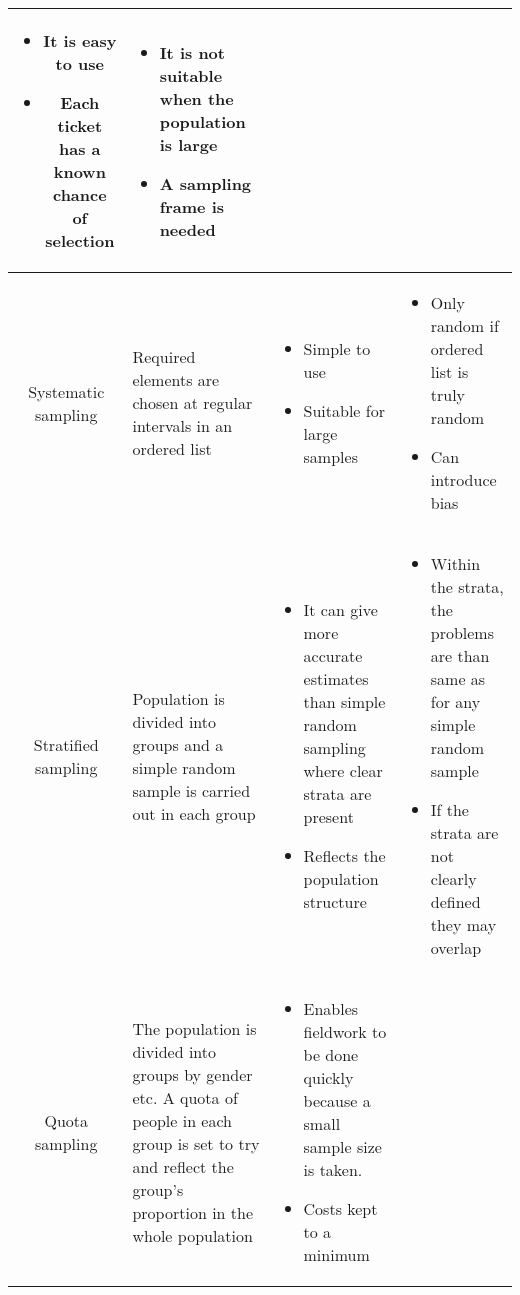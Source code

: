 \documentclass{article}[18pt]
\begin{document}
\begin{tabularx}{\textwidth}{|c|X|X|X|}
\begin{itemize}[noitemsep,topsep=0pt,leftmargin=*]
\item It is easy to use
\item Each ticket has a known chance of selection
\end{itemize}&
\begin{itemize}[noitemsep,topsep=0pt,leftmargin=*]
\item It is not suitable when the population is large
\item A sampling frame is needed
\end{itemize}\\
\hline
Systematic sampling&Required elements are chosen at regular intervals in an ordered list&
\begin{itemize}[noitemsep,topsep=0pt,leftmargin=*]
\item Simple to use
\item Suitable for large samples
\end{itemize}&
\begin{itemize}[noitemsep,topsep=0pt,leftmargin=*]
\item Only random if ordered list is truly random
\item Can introduce bias
\end{itemize}\\
\hline
Stratified sampling&Population is divided into groups and a simple random sample is carried out in each group&
\begin{itemize}[noitemsep,topsep=0pt,leftmargin=*]
\item It can give more accurate estimates than simple random sampling where clear strata are present
\item Reflects the population structure
\end{itemize}&
\begin{itemize}[noitemsep,topsep=0pt,leftmargin=*]
\item Within the strata, the problems are than same as for any simple random sample
\item If the strata are not clearly defined they may overlap
\end{itemize}\\
\hline
Quota sampling&The population is divided into groups by gender etc. A quota of people in each group is set to try and reflect the group's proportion in the whole population&
\begin{itemize}[noitemsep,topsep=0pt,leftmargin=*]
\item Enables fieldwork to be done quickly because a small sample size is taken.
\item Costs kept to a minimum

\end{itemize}
\end{tabularx}
\end{document}
